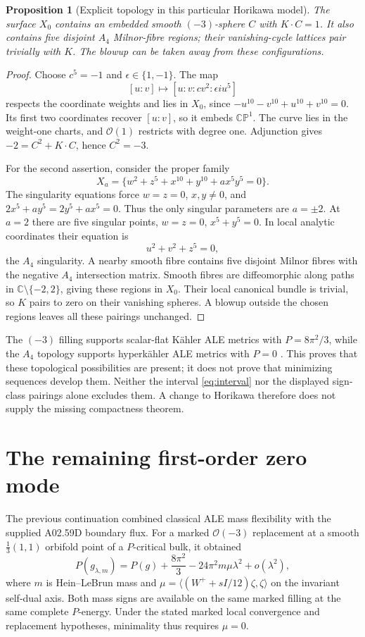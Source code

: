 \documentclass[11pt]{article}
\newtheorem{proposition}{Proposition}
\newcommand{\CP}{\mathbb{CP}}
\begin{document}
\begin{proposition}[Explicit topology in this particular Horikawa model]
The surface $X_0$ contains an embedded smooth $(-3)$-sphere $C$ with
$K\cdot C=1$. It also contains five disjoint $A_4$ Milnor-fibre regions;
their vanishing-cycle lattices pair trivially with $K$. The blowup can
be taken away from these configurations.
\end{proposition}
\begin{proof}
Choose $c^5=-1$ and $\epsilon\in\{1,-1\}$. The map
\[
 [u:v]\longmapsto[u:v:cv^2:\epsilon i u^5]
\]
respects the coordinate weights and lies in $X_0$, since
$-u^{10}-v^{10}+u^{10}+v^{10}=0$. Its first two coordinates recover
$[u:v]$, so it embeds $\CP^1$. The curve lies in the weight-one charts,
and $\mathcal O(1)$ restricts with degree one. Adjunction gives
$-2=C^2+K\cdot C$, hence $C^2=-3$.

For the second assertion, consider the proper family
\[
 X_a=\{w^2+z^5+x^{10}+y^{10}+ax^5y^5=0\}.
\]
The singularity equations force $w=z=0$, $x,y\ne0$, and
$2x^5+ay^5=2y^5+ax^5=0$. Thus the only singular parameters are
$a=\pm2$. At $a=2$ there are five singular points,
$w=z=0$, $x^5+y^5=0$. In local analytic coordinates their equation is
\[
 u^2+v^2+z^5=0,
\]
the $A_4$ singularity. A nearby smooth fibre contains five disjoint
Milnor fibres with the negative $A_4$ intersection matrix. Smooth fibres
are diffeomorphic along paths in $\mathbb C\setminus\{-2,2\}$, giving
these regions in $X_0$. Their local canonical bundle is trivial, so $K$
pairs to zero on their vanishing spheres. A blowup outside the chosen
regions leaves all these pairings unchanged.
\end{proof}

The $(-3)$ filling supports scalar-flat K\"ahler ALE metrics with
$P=8\pi^2/3$, while the $A_4$ topology supports hyperk\"ahler ALE
metrics with $P=0$ \cite{Kronheimer,Suvaina}. This proves that these
topological possibilities are present; it does not prove that minimizing
sequences develop them. Neither the interval \eqref{eq:interval} nor the
displayed sign-class pairings alone excludes them. A change to Horikawa
therefore does not supply the missing compactness theorem.

\section{The remaining first-order zero mode}
The previous continuation combined classical ALE mass flexibility with
the supplied A02.59D boundary flux. For a marked $\mathcal O(-3)$
replacement at a smooth $\frac13(1,1)$ orbifold point of a $P$-critical
bulk, it obtained
\begin{equation}
 P(g_{\lambda,m})=P(g)+\frac{8\pi^2}{3}
       -24\pi^2m\mu\lambda^2+o(\lambda^2),
 \label{eq:mass}
\end{equation}
where $m$ is Hein--LeBrun mass and
$\mu=\langle(W^++sI/12)\zeta,\zeta\rangle$ on the invariant
self-dual axis. Both mass signs are available on the same marked filling
at the same complete $P$-energy. Under the stated marked local convergence
and replacement hypotheses, minimality thus requires $\mu=0$.
\end{document}
